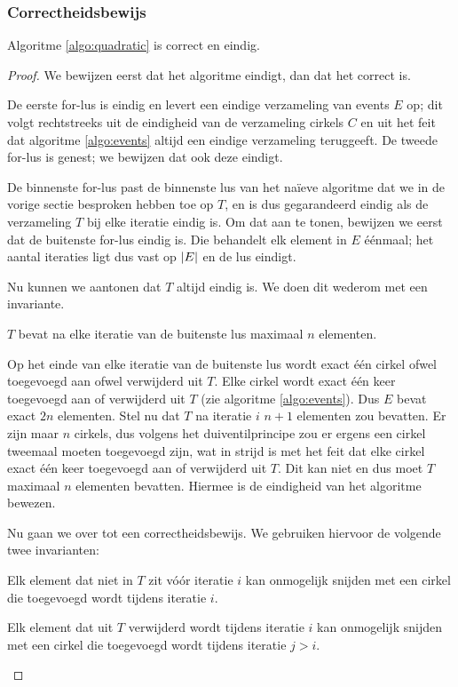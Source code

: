 \subsubsection{Correctheidsbewijs}
\begin{stl} Algoritme \ref{algo:quadratic} is correct en eindig.\end{stl}
\begin{proof}
We bewijzen eerst dat het algoritme eindigt, dan dat het correct
is. 

De eerste for-lus is eindig en levert een eindige verzameling van
events $E$ op; dit volgt rechtstreeks uit de eindigheid van de
verzameling cirkels $C$ en uit het feit dat algoritme
\ref{algo:events} altijd een eindige verzameling teruggeeft. De tweede
for-lus is genest; we bewijzen dat ook deze eindigt.

De binnenste for-lus past de binnenste lus van het na\"ieve algoritme
dat we in de vorige sectie besproken hebben toe op $T$, en is dus
gegarandeerd eindig als de verzameling $T$ bij elke iteratie eindig
is. Om dat aan te tonen, bewijzen we eerst dat de buitenste for-lus
eindig is.  Die behandelt elk element in $E$ \'e\'enmaal; het aantal
iteraties ligt dus vast op $\left|E\right|$ en de lus eindigt.

Nu kunnen we aantonen dat $T$ altijd eindig is. We doen dit wederom
met een invariante.

\begin{inv}
$T$ bevat na elke iteratie van de buitenste lus maximaal $n$ elementen.
\end{inv}

Op het einde van elke iteratie van de buitenste lus wordt exact
\'e\'en cirkel ofwel toegevoegd aan ofwel verwijderd uit $T$. Elke
cirkel wordt exact \'e\'en keer toegevoegd aan of verwijderd uit $T$
(zie algoritme \ref{algo:events}). Dus $E$ bevat exact $2n$
elementen. Stel nu dat $T$ na iteratie $i$ $n + 1$ elementen zou
bevatten. Er zijn maar $n$ cirkels, dus volgens het duiventilprincipe
zou er ergens een cirkel tweemaal moeten toegevoegd zijn, wat in
strijd is met het feit dat elke cirkel exact \'e\'en keer
toegevoegd aan of verwijderd uit $T$. Dit kan niet en dus moet $T$
maximaal $n$ elementen bevatten. Hiermee is de eindigheid van het
algoritme bewezen.

Nu gaan we over tot een correctheidsbewijs. We gebruiken hiervoor de
volgende twee invarianten:

\begin{inv}
Elk element dat niet in $T$ zit v\'o\'or iteratie $i$ kan onmogelijk
snijden met een cirkel die toegevoegd wordt tijdens iteratie $i$.
\end{inv}

\begin{inv}
Elk element dat uit $T$ verwijderd wordt tijdens iteratie $i$ kan onmogelijk
snijden met een cirkel die toegevoegd wordt tijdens iteratie $j > i$.
\end{inv}

\end{proof}
